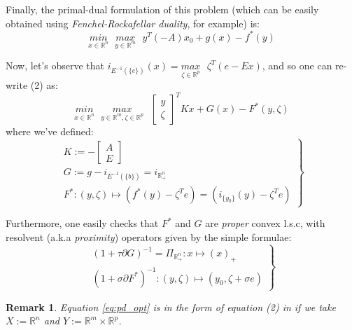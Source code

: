 \documentclass[a4paper,10pt,journal]{IEEEtran}
\newtheorem{remark}{Remark}
\begin{document}
Finally, the primal-dual formulation of this problem (which can be easily obtained using
\textit{Fenchel-Rockafellar duality}, for example) is:
\begin{equation}
  \underset{x \in \mathbb{R}^n}{min}\text{ }\underset{y \in \mathbb{R}^m}{max}\text{ }{y^T(-A)x_0 + g(x) - f^*(y)}
\end{equation}

Now, let's observe that $i_{E^{-1}(\{e\})}(x) = \underset{\zeta \in \mathbb{R}^p}{max}\text{ }\zeta^T(e - Ex)$, and so one can re-write (2) as:
\begin{equation}
  \underset{x \in \mathbb{R}^n}{min}\text{ }\underset{y \in \mathbb{R}^m, \zeta \in \mathbb{R}^p}{max}\text{ }
  \begin{bmatrix}y\\\zeta\end{bmatrix}^TKx + G(x) - F^*(y, \zeta)
  \label{eq:pd_opt}
\end{equation}
where we've defined:
\begin{equation}
  \left.
  \begin{aligned}
    K := -\begin{bmatrix}A\\E\end{bmatrix}\\
    G := g - i_{E^{-1}(\{b\})} = i_{\mathbb{R}_{+}^n}\\
    F^*: (y, \zeta) \mapsto (f^*(y) - \zeta^Te) = (i_{\{y_0\}}(y) - \zeta^Te)
  \end{aligned}
  \right\}
\end{equation}

Furthermore, one easily checks that $F^*$ and $G$ are \textit{proper} convex l.s.c, with resolvent
(a.k.a \textit{proximity}) operators given by the simple formulae:
\begin{equation}
  \left.
  \begin{aligned}
    (1 + \tau \partial G)^{-1} = \Pi_{\mathbb{R}_+^n}: x \mapsto (x)_+\\
    (1 + \sigma \partial F^*)^{-1}: (y, \zeta) \mapsto (y_0, \zeta + \sigma e)
  \end{aligned}
  \right\}
\end{equation}

\begin{remark}
Equation \eqref{eq:pd_opt} is in the form of equation (2) in \cite{chambolle2010} if we take $X := \mathbb{R}^n$ and
$Y := \mathbb{R}^m \times \mathbb{R}^p$.
\end{remark}
\end{document}
